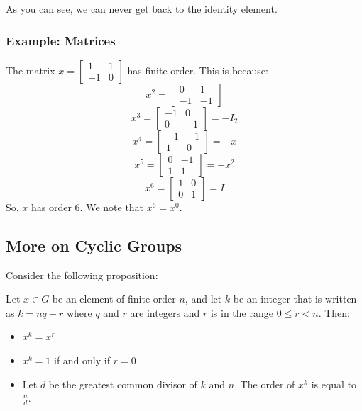 \documentclass[letterpaper]{article}
\begin{document}
As you can see, we can never get back to the identity element. 

\subsubsection{Example: Matrices}
The matrix $x = \begin{bmatrix}
    1 & 1 \\ 
    -1 & 0
\end{bmatrix}$ has finite order. This is because: 
\[x^2 = \begin{bmatrix}
    0 & 1 \\ 
    -1 & -1
\end{bmatrix}\]
\[x^3 = \begin{bmatrix}
    -1 & 0 \\ 
    0 & -1
\end{bmatrix} = -I_2\]
\[x^4 = \begin{bmatrix}
    -1 & -1 \\ 
    1 & 0
\end{bmatrix} = -x\]
\[x^5 = \begin{bmatrix}
    0 & -1 \\ 
    1 & 1
\end{bmatrix} = -x^2\]
\[x^6 = \begin{bmatrix}
    1 & 0 \\ 
    0 & 1
\end{bmatrix} = I\]
So, $x$ has order 6. We note that $x^6 = x^0$. 

\subsection{More on Cyclic Groups}
Consider the following proposition: 
\begin{mdframed}
    \begin{proposition}
        Let $x \in G$ be an element of finite order $n$, and let $k$ be an integer that is written as $k = nq + r$ where $q$ and $r$ are integers and $r$ is in the range $0 \leq r < n$. Then: 
        \begin{itemize}
            \item $x^k = x^r$ 
            \item $x^k = 1$ if and only if $r = 0$
            \item Let $d$ be the greatest common divisor of $k$ and $n$. The order of $x^k$ is equal to $\frac{n}{d}$. 
        \end{itemize} 
    \end{proposition}
\end{mdframed}
\end{document}
